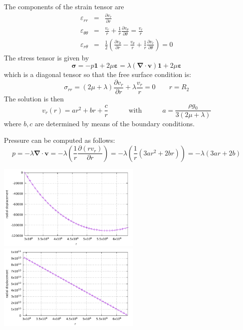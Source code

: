 The components of the strain tensor are 
\begin{eqnarray}
\varepsilon_{rr} &=& \frac{\partial v_r}{\partial r} \\
\varepsilon_{\theta\theta} &=& \frac{v_r}{r} + \frac{1}{r} \frac{\partial v_\theta}{\partial \theta}
= \frac{v_r}{r} 
 \\
\varepsilon_{r\theta} &=& \frac{1}{2} \left(   \frac{\partial v_\theta}{\partial r} - \frac{v_\theta}{r} 
+\frac{1}{r} \frac{\partial v_r}{\partial \theta}  \right) =0
\end{eqnarray}
The stress tensor is given by 
\[
{\bm \sigma} 
= - p {\bm 1} + 2\mu {\bm \varepsilon}
=  \lambda ({\bm \nabla}\cdot {\bm v}) {\bm 1} + 2\mu {\bm \varepsilon}
\]
which is a diagonal tensor so that the free surface condition is:
\[
\sigma_{rr} = (2\mu+\lambda) \frac{\partial v_r}{\partial r} +\lambda \frac{v_r}{r}   =0 \quad\quad r=R_2
\]
The solution is then 
\[
v_r(r) =  
a r^2 + br + \frac{c}{r}
\quad\quad\quad
\text{with}
\quad\quad\quad
a=\frac{\rho g_0 }{3(2\mu + \lambda)} 
\]
where $b,c$ are determined by means of the boundary conditions.

Pressure can be computed as follows: 
\[
p=-\lambda {\bm \nabla}\cdot {\bm v}
= -\lambda \left( \frac{1}{r} \frac{\partial (r v_r)}{\partial r} \right)
= -\lambda \left( \frac{1}{r} ( 3ar^2 + 2br  )\right)
= -\lambda ( 3ar + 2b  )
\]

\begin{center}
\includegraphics[width=7cm]{python_codes/fieldstone_36/displacement_rtheta.pdf}
\includegraphics[width=7cm]{python_codes/fieldstone_36/pressure_rtheta.pdf}
\end{center}

